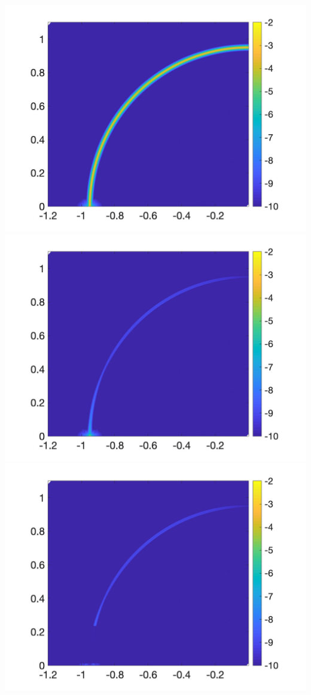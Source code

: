 \includegraphics[trim=40 20 40 10, clip, width=2.5truein]{figs/fig400a} 
\includegraphics[trim=40 20 40 10, clip, width=2.5truein]{figs/fig400b} 
\includegraphics[trim=40 20 40 10, clip, width=2.5truein]{figs/fig400c}\\

